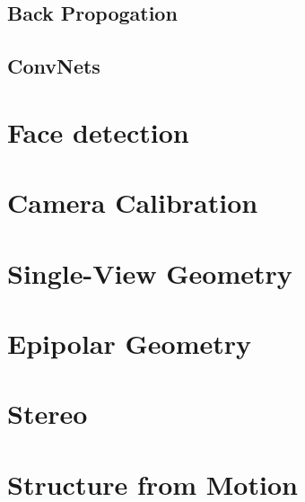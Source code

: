 \documentclass[english, 11pt]{article}
\begin{document}
\subsection{Back Propogation}
\subsection{ConvNets}
\section{Face detection}
\section{Camera Calibration}
\section{Single-View Geometry}
\section{Epipolar Geometry}
\section{Stereo}
\section{Structure from Motion}
\end{document}
